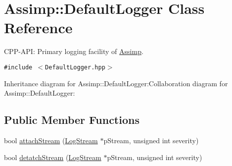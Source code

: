 \hypertarget{class_assimp_1_1_default_logger}{
\section{Assimp::DefaultLogger Class Reference}
\label{class_assimp_1_1_default_logger}
}
CPP-API: Primary logging facility of \hyperlink{namespace_assimp}{Assimp}.  


{\tt \#include $<$DefaultLogger.hpp$>$}

Inheritance diagram for Assimp::DefaultLogger:Collaboration diagram for Assimp::DefaultLogger:\subsection*{Public Member Functions}
\begin{CompactItemize}
\item 
bool \hyperlink{class_assimp_1_1_default_logger_bc0ca7a337f8c3e38eca0eb45bb1ccf0}{attachStream} (\hyperlink{class_assimp_1_1_log_stream}{LogStream} $\ast$pStream, unsigned int severity)
\item 
bool \hyperlink{class_assimp_1_1_default_logger_2615f1d1624f1d742d0cf2dd4a5cccc8}{detatchStream} (\hyperlink{class_assimp_1_1_log_stream}{LogStream} $\ast$pStream, unsigned int severity)
\end{CompactItemize}
